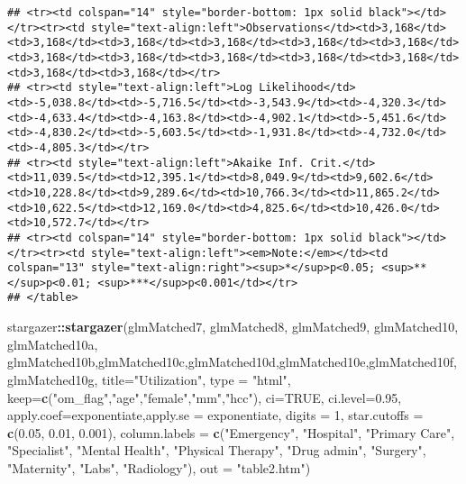 \documentclass[]{article}
\newenvironment{Shaded}{\begin{snugshade}}{\end{snugshade}}
\newcommand{\KeywordTok}[1]{\textcolor[rgb]{0.13,0.29,0.53}{\textbf{#1}}}
\newcommand{\DataTypeTok}[1]{\textcolor[rgb]{0.13,0.29,0.53}{#1}}
\newcommand{\DecValTok}[1]{\textcolor[rgb]{0.00,0.00,0.81}{#1}}
\newcommand{\FloatTok}[1]{\textcolor[rgb]{0.00,0.00,0.81}{#1}}
\newcommand{\StringTok}[1]{\textcolor[rgb]{0.31,0.60,0.02}{#1}}
\newcommand{\OtherTok}[1]{\textcolor[rgb]{0.56,0.35,0.01}{#1}}
\newcommand{\OperatorTok}[1]{\textcolor[rgb]{0.81,0.36,0.00}{\textbf{#1}}}
\newcommand{\NormalTok}[1]{#1}
\begin{document}
\begin{verbatim}
## <tr><td colspan="14" style="border-bottom: 1px solid black"></td></tr><tr><td style="text-align:left">Observations</td><td>3,168</td><td>3,168</td><td>3,168</td><td>3,168</td><td>3,168</td><td>3,168</td><td>3,168</td><td>3,168</td><td>3,168</td><td>3,168</td><td>3,168</td><td>3,168</td><td>3,168</td></tr>
## <tr><td style="text-align:left">Log Likelihood</td><td>-5,038.8</td><td>-5,716.5</td><td>-3,543.9</td><td>-4,320.3</td><td>-4,633.4</td><td>-4,163.8</td><td>-4,902.1</td><td>-5,451.6</td><td>-4,830.2</td><td>-5,603.5</td><td>-1,931.8</td><td>-4,732.0</td><td>-4,805.3</td></tr>
## <tr><td style="text-align:left">Akaike Inf. Crit.</td><td>11,039.5</td><td>12,395.1</td><td>8,049.9</td><td>9,602.6</td><td>10,228.8</td><td>9,289.6</td><td>10,766.3</td><td>11,865.2</td><td>10,622.5</td><td>12,169.0</td><td>4,825.6</td><td>10,426.0</td><td>10,572.7</td></tr>
## <tr><td colspan="14" style="border-bottom: 1px solid black"></td></tr><tr><td style="text-align:left"><em>Note:</em></td><td colspan="13" style="text-align:right"><sup>*</sup>p<0.05; <sup>**</sup>p<0.01; <sup>***</sup>p<0.001</td></tr>
## </table>
\end{verbatim}

\begin{Shaded}
\begin{Highlighting}[]
\NormalTok{stargazer}\OperatorTok{::}\KeywordTok{stargazer}\NormalTok{(glmMatched7, glmMatched8, glmMatched9, glmMatched10, glmMatched10a, glmMatched10b,glmMatched10c,glmMatched10d,glmMatched10e,glmMatched10f,glmMatched10g,}
          \DataTypeTok{title=}\StringTok{"Utilization"}\NormalTok{, }
          \DataTypeTok{type =} \StringTok{"html"}\NormalTok{,}
          \DataTypeTok{keep=}\KeywordTok{c}\NormalTok{(}\StringTok{"om_flag"}\NormalTok{,}\StringTok{"age"}\NormalTok{,}\StringTok{"female"}\NormalTok{,}\StringTok{"mm"}\NormalTok{,}\StringTok{"hcc"}\NormalTok{),}
          \DataTypeTok{ci=}\OtherTok{TRUE}\NormalTok{, }\DataTypeTok{ci.level=}\FloatTok{0.95}\NormalTok{,}
          \DataTypeTok{apply.coef=}\NormalTok{exponentiate,}\DataTypeTok{apply.se =}\NormalTok{ exponentiate,}
          \DataTypeTok{digits =} \DecValTok{1}\NormalTok{, }
          \DataTypeTok{star.cutoffs =} \KeywordTok{c}\NormalTok{(}\FloatTok{0.05}\NormalTok{, }\FloatTok{0.01}\NormalTok{, }\FloatTok{0.001}\NormalTok{),}
          \DataTypeTok{column.labels =} \KeywordTok{c}\NormalTok{(}\StringTok{"Emergency"}\NormalTok{, }\StringTok{"Hospital"}\NormalTok{, }\StringTok{"Primary Care"}\NormalTok{, }\StringTok{"Specialist"}\NormalTok{, }\StringTok{"Mental Health"}\NormalTok{, }\StringTok{"Physical Therapy"}\NormalTok{, }\StringTok{"Drug admin"}\NormalTok{, }\StringTok{"Surgery"}\NormalTok{, }\StringTok{"Maternity"}\NormalTok{, }\StringTok{"Labs"}\NormalTok{, }\StringTok{"Radiology"}\NormalTok{),}
          \DataTypeTok{out =} \StringTok{"table2.htm"}\NormalTok{)}
\end{Highlighting}
\end{Shaded}
\end{document}
